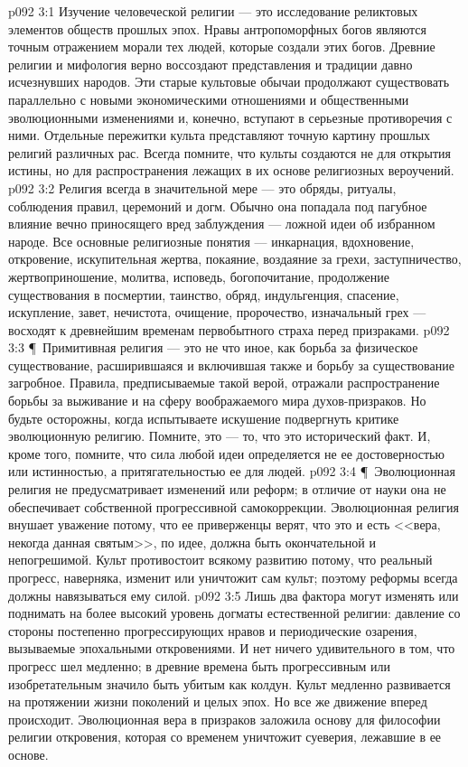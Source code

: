\vs p092 3:1 Изучение человеческой религии --- это исследование реликтовых элементов обществ прошлых эпох. Нравы антропоморфных богов являются точным отражением морали тех людей, которые создали этих богов. Древние религии и мифология верно воссоздают представления и традиции давно исчезнувших народов. Эти старые культовые обычаи продолжают существовать параллельно с новыми экономическими отношениями и общественными эволюционными изменениями и, конечно, вступают в серьезные противоречия с ними. Отдельные пережитки культа представляют точную картину прошлых религий различных рас. Всегда помните, что культы создаются не для открытия истины, но для распространения лежащих в их основе религиозных вероучений.
\vs p092 3:2 Религия всегда в значительной мере --- это обряды, ритуалы, соблюдения правил, церемоний и догм. Обычно она попадала под пагубное влияние вечно приносящего вред заблуждения --- ложной идеи об избранном народе. Все основные религиозные понятия --- инкарнация, вдохновение, откровение, искупительная жертва, покаяние, воздаяние за грехи, заступничество, жертвоприношение, молитва, исповедь, богопочитание, продолжение существования в посмертии, таинство, обряд, индульгенция, спасение, искупление, завет, нечистота, очищение, пророчество, изначальный грех --- восходят к древнейшим временам первобытного страха перед призраками.
\vs p092 3:3 \P\ Примитивная религия --- это не что иное, как борьба за физическое существование, расширившаяся и включившая также и борьбу за существование загробное. Правила, предписываемые такой верой, отражали распространение борьбы за выживание и на сферу воображаемого мира духов\hyp{}призраков. Но будьте осторожны, когда испытываете искушение подвергнуть критике эволюционную религию. Помните, это --- то, что  это исторический факт. И, кроме того, помните, что сила любой идеи определяется не ее достоверностью или истинностью, а притягательностью ее для людей.
\vs p092 3:4 \P\ Эволюционная религия не предусматривает изменений или реформ; в отличие от науки она не обеспечивает собственной прогрессивной самокоррекции. Эволюционная религия внушает уважение потому, что ее приверженцы верят, что это и есть  <<вера, некогда данная святым>>, по идее, должна быть окончательной и непогрешимой. Культ противостоит всякому развитию потому, что реальный прогресс, наверняка, изменит или уничтожит сам культ; поэтому реформы всегда должны навязываться ему силой.
\vs p092 3:5 Лишь два фактора могут изменять или поднимать на более высокий уровень догматы естественной религии: давление со стороны постепенно прогрессирующих нравов и периодические озарения, вызываемые эпохальными откровениями. И нет ничего удивительного в том, что прогресс шел медленно; в древние времена быть прогрессивным или изобретательным значило быть убитым как колдун. Культ медленно развивается на протяжении жизни поколений и целых эпох. Но все же движение вперед происходит. Эволюционная вера в призраков заложила основу для философии религии откровения, которая со временем уничтожит суеверия, лежавшие в ее основе.
